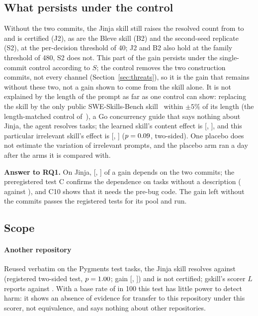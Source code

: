 \documentclass[sigconf,review,anonymous]{acmart}
\begin{document}
\subsection{What persists under the control}\label{sec:residual}
Without the two commits, the Jinja skill still raises the resolved count from \njinjaLFNone{} to
\njinjaLFSkill{} and is certified (J2), as are the Bleve skill (B2) and the second-seed replicate
(S2), at the per-decision threshold of 40; J2 and B2 also hold at the family threshold of 480, S2
does not. This part of the gain persists under the single-commit control according to $S$; the control
removes the two construction commits, not every channel (Section~\ref{sec:threats}), so it is the
gain that remains without these two, not a gain shown to come from the skill alone. It is not
explained by the length of the prompt as far as one control can show: replacing the skill by the
only public SWE-Skills-Bench skill~\cite{sskb_paper} within $\pm5\%$ of its length (the
length-matched control of~\cite{webdev_skills_bench_2026}), a
Go concurrency guide that says nothing about Jinja, the agent resolves \nplcS{} tasks; the learned
skill's content effect is \nconGain{} [\nconGainLo{}, \nconGainHi{}], and this particular irrelevant
skill's effect is \nlenGain{} [\nlenGainLo{}, \nlenGainHi{}] ($p=0.09$, two-sided). One placebo
does not estimate the variation of irrelevant prompts, and the placebo arm ran a day after the arms
it is compared with.

\noindent\textbf{Answer to RQ1.} On Jinja, \nleak{} [\nleakLo{}, \nleakHi{}] of a \njinjaGain{} gain
depends on the two commits; the preregistered test C confirms the dependence on tasks without a
description (\ncfFor{} against \ncfAgainst{}), and C10 shows that it needs the pre-bug code. The gain
left without the commits passes the registered tests for its pool and run.

\subsection{Scope}\label{sec:scope}
\paragraph{Another repository}
Reused verbatim on the \npygN{} Pygments test tasks, the Jinja skill resolves \npygSkill{} against
\npygNone{} (registered two-sided test, $p=1.00$; gain \npygGain{} [\npygGainLo{}, \npygGainHi{}])
and is not certified; gskill's scorer $L$ reports \npygLSkill{} against \npygLNone{}. With a base
rate of \npygNone{} in 100 this test has little power to detect harm: it shows an absence of
evidence for transfer to this repository under this scorer, not equivalence, and says nothing about
other repositories.
\end{document}
